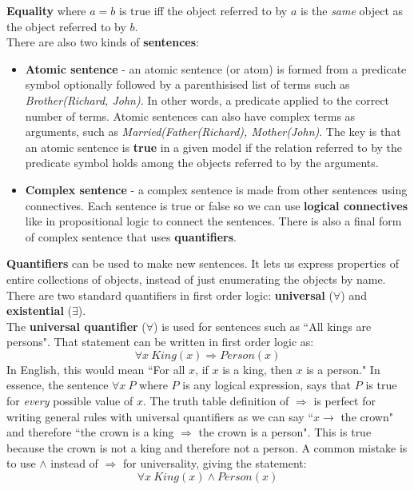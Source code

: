 \documentclass{article}
\newcommand{\n}[0]{\\[\baselineskip]}
\begin{document}
\textbf{Equality} where $a = b$ is true iff the object referred to by $a$ is the \textit{same} object as the object referred to by $b$.
\n
There are also two kinds of \textbf{sentences}:
\begin{itemize}
\item \textbf{Atomic sentence} - an atomic sentence (or atom) is formed from a predicate symbol optionally followed by a parenthisised list of terms such as \textit{Brother(Richard, John)}. In other words, a predicate applied to the correct number of terms. Atomic sentences can also have complex terms as arguments, such as \textit{Married(Father(Richard), Mother(John)}. The key is that an atomic sentence is \textbf{true} in a given model if the relation referred to by the predicate symbol holds among the objects referred to by the arguments.
\item \textbf{Complex sentence} - a complex sentence is made from other sentences using connectives. Each sentence is true or false so we can use \textbf{logical connectives} like in propositional logic to connect the sentences. There is also a final form of complex sentence that uses \textbf{quantifiers}.
\end{itemize}
\textbf{Quantifiers} can be used to make new sentences. It lets us express properties of entire collections of objects, instead of just enumerating the objects by name. There are two standard quantifiers in first order logic: \textbf{universal} ($\forall$) and \textbf{existential} ($\exists$).
\n
The \textbf{universal quantifier} ($\forall$) is used for sentences such as ``All kings are persons". That statement can be written in first order logic as:
\begin{equation}
\forall x\ King(x) \Rightarrow Person(x)
\end{equation}
In English, this would mean ``For all $x$, if $x$ is a king, then $x$ is a person." In essence, the sentence $\forall x\ P$ where $P$ is any logical expression, says that $P$ is true for \textit{every} possible value of $x$. The truth table definition of $\Rightarrow$ is perfect for writing general rules with universal quantifiers as we can say ``$x \rightarrow$ the crown" and therefore ``the crown is a king $\Rightarrow$ the crown is a person". This is true because the crown is not a king and therefore not a person. A common mistake is to use $\wedge$ instead of $\Rightarrow$ for universality, giving the statement:
\begin{equation}
\forall x\ King(x) \wedge Person(x)
\end{equation}
\end{document}
